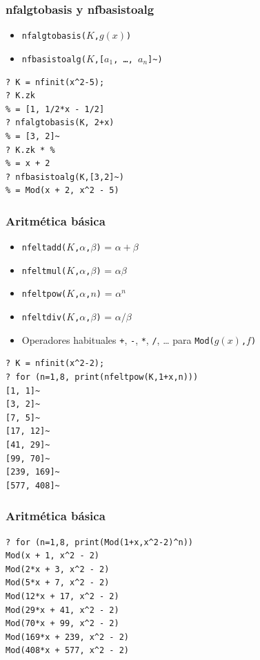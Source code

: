 \documentclass{beamer}
\begin{document}
\begin{frame}[fragile]
  \frametitle{nfalgtobasis y nfbasistoalg}

  \begin{itemize}
  \item \texttt{nfalgtobasis($K$,$g(x)$)}

  \item \texttt{nfbasistoalg($K$,[$a_1$, \ldots, $a_n$]\textasciitilde)}
  \end{itemize}

  \begin{shaded}\small
\begin{verbatim}
? K = nfinit(x^2-5);
? K.zk
% = [1, 1/2*x - 1/2]
? nfalgtobasis(K, 2+x)
% = [3, 2]~
? K.zk * %
% = x + 2
? nfbasistoalg(K,[3,2]~)
% = Mod(x + 2, x^2 - 5)
\end{verbatim}
  \end{shaded}
\end{frame}


\begin{frame}[fragile]
  \frametitle{Aritmética básica}

  \begin{itemize}
  \item \texttt{nfeltadd($K$,$\alpha$,$\beta$)} = $\alpha + \beta$
  \item \texttt{nfeltmul($K$,$\alpha$,$\beta$)} = $\alpha\beta$
  \item \texttt{nfeltpow($K$,$\alpha$,$n$)} = $\alpha^n$
  \item \texttt{nfeltdiv($K$,$\alpha$,$\beta$)} = $\alpha/\beta$
  \item Operadores habituales \texttt{+}, \texttt{-}, \texttt{*}, \texttt{/},
    \dots{} para \texttt{Mod($g(x)$,$f$)}
  \end{itemize}

  \begin{shaded}\small
\begin{verbatim}
? K = nfinit(x^2-2);
? for (n=1,8, print(nfeltpow(K,1+x,n)))
[1, 1]~
[3, 2]~
[7, 5]~
[17, 12]~
[41, 29]~
[99, 70]~
[239, 169]~
[577, 408]~
\end{verbatim}
  \end{shaded}
\end{frame}


\begin{frame}[fragile]
  \frametitle{Aritmética básica}

  \begin{shaded}\small
\begin{verbatim}
? for (n=1,8, print(Mod(1+x,x^2-2)^n))
Mod(x + 1, x^2 - 2)
Mod(2*x + 3, x^2 - 2)
Mod(5*x + 7, x^2 - 2)
Mod(12*x + 17, x^2 - 2)
Mod(29*x + 41, x^2 - 2)
Mod(70*x + 99, x^2 - 2)
Mod(169*x + 239, x^2 - 2)
Mod(408*x + 577, x^2 - 2)
\end{verbatim}
  \end{shaded}
\end{frame}
\end{document}
